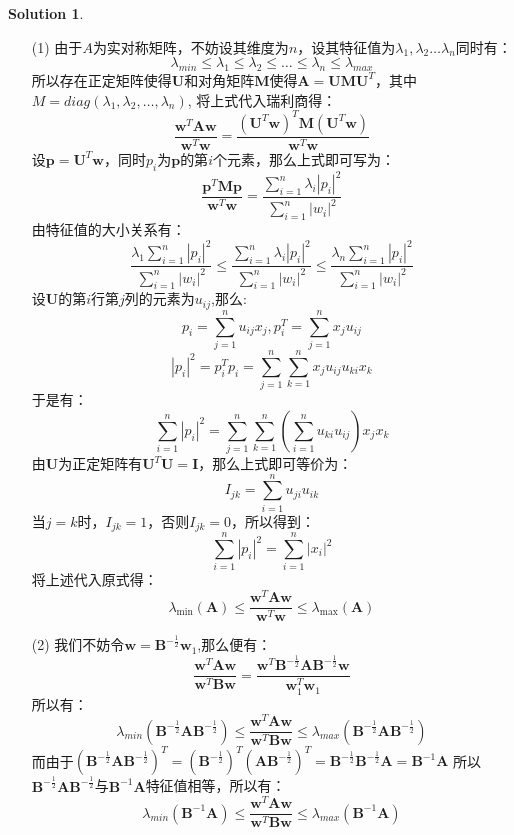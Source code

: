 \documentclass[a4paper,UTF8]{article}
\theoremstyle{definition}
\newtheorem*{solution}{Solution}
\begin{document}
\begin{solution}
	\begin{enumerate}
		\item [(1)]
		      由于$A$为实对称矩阵，不妨设其维度为$n$，设其特征值为$\lambda_1,\lambda_2\ldots\lambda_n$同时有：
		      \[\lambda_{min}\leqslant \lambda_1\leqslant\lambda_2\leqslant\ldots\leqslant\lambda_n\leqslant\lambda_{max}\]
		      所以存在正定矩阵使得$\bm{U}$和对角矩阵$\bm{M}$使得$\bm{A}=\bm{U}\bm{M}\bm{U}^T$，其中$M=diag(\lambda_1, \lambda_2, \ldots, \lambda_n)$,
		      将上式代入瑞利商得：
		      \[\frac{\bm{w}^T\bm{A}\bm{w}}{\bm{w}^T\bm{w}}=\frac{(\bm{U}^T\bm{w})^T\bm{M}(\bm{U}^T\bm{w})}{\bm{w}^T\bm{w}}\]
		      设$\bm{p}=\bm{U}^T\bm{w}$，同时$p_i$为$\bm{p}$的第$i$个元素，那么上式即可写为：
		      \[\frac{\bm{p}^T\bm{M}\bm{p}}{\bm{w}^T\bm{w}}=\frac{\sum_{i=1}^n\lambda_i|p_i|^2}{\sum_{i=1}^n|w_i|^2}\]
		      由特征值的大小关系有：
		      \[\frac{\lambda_1\sum_{i=1}^n|p_i|^2}{\sum_{i=1}^n|w_i|^2}\leqslant \frac{\sum_{i=1}^n\lambda_i|p_i|^2}{\sum_{i=1}^n|w_i|^2}\leqslant \frac{\lambda_n\sum_{i=1}^n|p_i|^2}{\sum_{i=1}^n|w_i|^2}\]
		      设$\bm{U}$的第$i$行第$j$列的元素为$u_{ij}$,那么:
		      \[p_i=\sum_{j=1}^nu_{ij}x_j, p_i^T=\sum_{j=1}^nx_ju_{ij}\]
		      \[|p_{i}|^{2}=p_{i}^{T} p_{i}=\sum_{j=1}^{n} \sum_{k=1}^{n} x_{j} u_{i j} u_{k i} x_{k}\]
		      于是有：
		      \[\sum_{i=1}^{n}\left|p_{i}\right|^{2}=\sum_{j=1}^{n} \sum_{k=1}^{n}\left(\sum_{i=1}^{n} u_{k i} u_{i j}\right) x_{j} x_{k}\]
		      由$\bm{U}$为正定矩阵有$\bm{U}^T\bm{U}=\bm{I}$，那么上式即可等价为：
		      \[I_{j k}=\sum_{i=1}^{n} u_{j i} u_{i k}\]
		      当$j=k$时，$I_{jk}=1$，否则$I_{jk}=0$，所以得到：
		      \[\sum_{i=1}^{n}\left|p_{i}\right|^{2}=\sum_{i=1}^{n}\left|x_{i}\right|^{2}\]
		      将上述代入原式得：
		      \[\lambda_{\min }(\bm{A}) \leq \frac{\bm{w}^{T} \bm{A} \bm{w}}{\bm{w}^{T} \bm{w}} \leq \lambda_{\max }(\bm{A})\]
		\item [(2)]
		      我们不妨令$\bm{w}=\bm{B}^{-\frac{1}{2}}\bm{w}_1$,那么便有：
		      \[\frac{\bm{w}^{T} \bm{A} \bm{w}}{\bm{w}^{T} \bm{B} \bm{w}}= \frac{\bm{w}^T\bm{B}^{-\frac{1}{2}}\bm{A}\bm{B}^{-\frac{1}{2}}\bm{w}}{\bm{w}_1^T\bm{w}_1}\]
		      所以有：
		      \[\lambda_{min}(\bm{B}^{-\frac{1}{2}}\bm{A}\bm{B}^{-\frac{1}{2}})\leq \frac{\bm{w}^T \bm{A} \bm{w}}{\bm{w}^T \bm{B} \bm{w}}\leq\lambda_{max}(\bm{B}^{-\frac{1}{2}}\bm{A}\bm{B}^{-\frac{1}{2}})\]
		      而由于$(\bm{B}^{-\frac{1}{2}}\bm{A}\bm{B}^{-\frac{1}{2}})^T=(\bm{B}^{-\frac{1}{2}})^T(\bm{A}\bm{B}^{-\frac{1}{2}})^T=\bm{B}^{-\frac{1}{2}}\bm{B}^{-\frac{1}{2}}\bm{A}=\bm{B}^{-1}\bm{A}$
		      所以$\bm{B}^{-\frac{1}{2}}\bm{A}\bm{B}^{-\frac{1}{2}}$与$\bm{B}^{-1}\bm{A}$特征值相等，所以有：
		      \[\lambda_{min}(\bm{B}^{-1}\bm{A})\leq\frac{\bm{w}^{T} \bm{A} \bm{w}}{\bm{w}^{T} \bm{B} \bm{w}}\leq\lambda_{max}(\bm{B}^{-1}\bm{A})\]
	\end{enumerate}
\end{solution}
\end{document}
